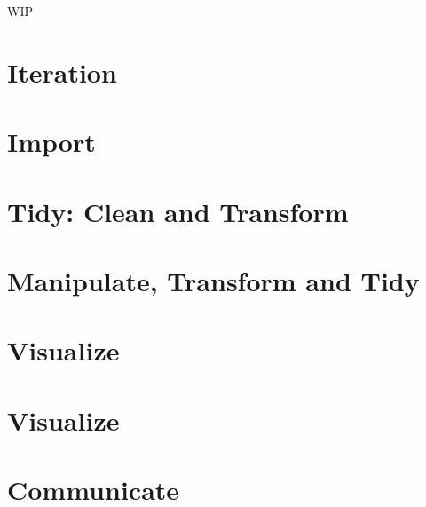 \documentclass[]{book}
\begin{document}
WIP

\hypertarget{iteration}{%
\chapter{Iteration}\label{iteration}}

\hypertarget{import}{%
\chapter{Import}\label{import}}

\hypertarget{tidy-clean-and-transform}{%
\chapter{Tidy: Clean and Transform}\label{tidy-clean-and-transform}}

\hypertarget{manipulate-transform-and-tidy}{%
\chapter{Manipulate, Transform and Tidy}\label{manipulate-transform-and-tidy}}

\hypertarget{visualize}{%
\chapter{Visualize}\label{visualize}}

\hypertarget{visualize-1}{%
\chapter{Visualize}\label{visualize-1}}

\hypertarget{communicate}{%
\chapter{Communicate}\label{communicate}}


\end{document}

